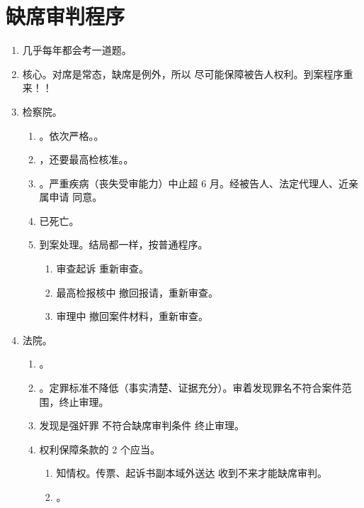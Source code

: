 \section{缺席审判程序}
\begin{enumerate}
  \item 几乎每年都会考一道题。
  \item 核心。对席是常态，缺席是例外，所以 \yi 尽可能保障被告人权利。\er 到案程序重来！！
  \item 检察院。
        \begin{enumerate}
          \item {}。\xjt 依次严格。。
          \item {}，还要最高检核准。\sjt {}。
          \item {}。严重疾病（丧失受审能力）中止超 6 月。经被告人、法定代理人、近亲属申请 \hz 同意。
          \item 已死亡。
          \item 到案处理。结局都一样，按普通程序。
                \begin{enumerate}
                  \item 审查起诉 \yjt 重新审查。
                  \item 最高检报核中 \yjt 撤回报请，重新审查。
                  \item 审理中 \yjt 撤回案件材料，重新审查。
                \end{enumerate}
        \end{enumerate}
  \item 法院。
        \begin{enumerate}
          \item {}。
          \item {}。定罪标准不降低（事实清楚、证据充分）。审着发现罪名不符合案件范围，终止审理。
          \item 发现是强奸罪 \yjt 不符合缺席审判条件 \yjt 终止审理。
          \item 权利保障条款的 2 个应当。
                \begin{enumerate}
                  \item 知情权。传票、起诉书副本域外送达 \yjt 收到不来才能缺席审判。
                  \item {}。
                        \begin{enumerate}

\end{enumerate}
\end{enumerate}
\end{enumerate}
\end{enumerate}
